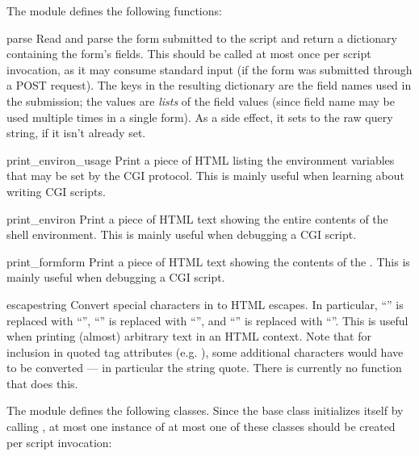 The  module defines the following functions:

\begin{funcdesc}{parse}{}
Read and parse the form submitted to the script and return a
dictionary containing the form's fields.  This should be called at
most once per script invocation, as it may consume standard input (if
the form was submitted through a POST request).  The keys in the
resulting dictionary are the field names used in the submission; the
values are {\em lists} of the field values (since field name may be
used multiple times in a single form).  As a side effect, it sets
 to the raw query string, if it isn't
already set.
\end{funcdesc}

\begin{funcdesc}{print_environ_usage}{}
Print a piece of HTML listing the environment variables that may be
set by the CGI protocol.
This is mainly useful when learning about writing CGI scripts.
\end{funcdesc}

\begin{funcdesc}{print_environ}{}
Print a piece of HTML text showing the entire contents of the shell
environment.  This is mainly useful when debugging a CGI script.
\end{funcdesc}

\begin{funcdesc}{print_form}{form}
Print a piece of HTML text showing the contents of the .
This is mainly useful when debugging a CGI script.
\end{funcdesc}

\begin{funcdesc}{escape}{string}
Convert special characters in  to HTML escapes.  In
particular, ``\code{\&}'' is replaced with ``'',
``\code{<}'' is replaced with ``'', and ``\code{>}'' is
replaced with ``''.  This is useful when printing (almost)
arbitrary text in an HTML context.  Note that for inclusion in quoted
tag attributes (e.g. ), some additional
characters would have to be converted --- in particular the string
quote.  There is currently no function that does this.
\end{funcdesc}

The module defines the following classes.  Since the base class
initializes itself by calling , at most one instance of
at most one of these classes should be created per script invocation:

